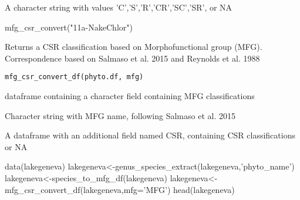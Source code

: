 \documentclass[a4paper]{book}
\begin{document}
%
\begin{Value}
A character string with values 'C','S','R','CR','SC','SR', or NA
\end{Value}
%
\begin{Examples}
\begin{ExampleCode}

mfg_csr_convert("11a-NakeChlor")
\end{ExampleCode}
\end{Examples}
%
\begin{Description}\relax
Returns a CSR classification based on Morphofunctional group (MFG).
Correspondence based on Salmaso et al. 2015 and Reynolds et al. 1988
\end{Description}
%
\begin{Usage}
\begin{verbatim}
mfg_csr_convert_df(phyto.df, mfg)
\end{verbatim}
\end{Usage}
%
\begin{Arguments}
\begin{ldescription}
\item[\code{phyto.df}] dataframe containing a character field containing MFG classifications

\item[\code{mfg}] Character string with MFG name, following Salmaso et al. 2015
\end{ldescription}
\end{Arguments}
%
\begin{Value}
A dataframe with an additional field named CSR, containing CSR classifications or NA
\end{Value}
%
\begin{Examples}
\begin{ExampleCode}

data(lakegeneva)
lakegeneva<-genus_species_extract(lakegeneva,'phyto_name')
lakegeneva<-species_to_mfg_df(lakegeneva)
lakegeneva<-mfg_csr_convert_df(lakegeneva,mfg='MFG')
head(lakegeneva)
\end{ExampleCode}
\end{Examples}
\end{document}
